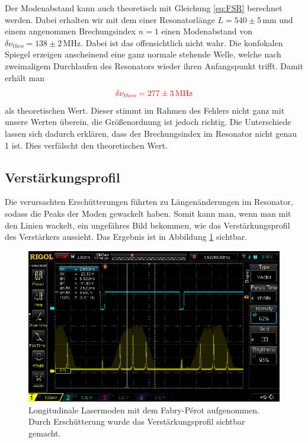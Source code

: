 Der Modenabstand kann auch theoretisch mit Gleichung \ref{eq:FSR} berechnet werden. Dabei erhalten wir mit dem einer Resonatorlänge $L = 540 \pm 5 \, \mathrm{mm}$ und 
einem angenommen Brechungsindex $n = 1$ einen Modenabstand von $\delta \nu _{theo} = 138 \pm 2\, \mathrm{MHz}$. Dabei ist das offensichtlich nicht wahr. Die konfokalen Spiegel erzeigen anscheinend eine ganz normale stehende Welle, welche nach zweimaligem Durchlaufen
des Resonators wieder ihren Anfangspunkt trifft. Damit erhält man 
\begin{equation}
    \textcolor{red}{\delta \nu_{theo} = 277 \pm 3\, \mathrm{MHz}}
    \label{eq:theFSR}
\end{equation}
als theoretischen Wert. Dieser stimmt im Rahmen des Fehlers nicht ganz mit unsere Werten überein, die Größenordnung ist jedoch richtig. Die Unterschiede lassen sich dadurch erklären, dass 
der Brechungsindex im Resonator nicht genau 1 ist. Dies verfälscht den theoretischen Wert.



\subsection*{Verstärkungsprofil}

Die verursachten Erschütterungen führten zu Längenänderungen im Resonator, sodass die Peaks der Moden gewackelt haben.
Somit kann man, wenn man mit den Linien wackelt, ein ungefähres Bild bekommen, wie das Verstärkungsprofil
des Verstärkers aussieht. Das Ergebnis ist in Abbildung \ref{bild:Verstaerkung} sichtbar.

\begin{figure}[h]
    \centering
    \includegraphics[width = \linewidth]{Bilder/Auswertung/FabryPerotVerst.png}
    \caption{Longitudinale Lasermoden mit dem Fabry-Pérot aufgenommen. Durch Erschütterung wurde das Verstärkungsprofil sichtbar gemacht.}
    \label{bild:Verstaerkung}
\end{figure}

